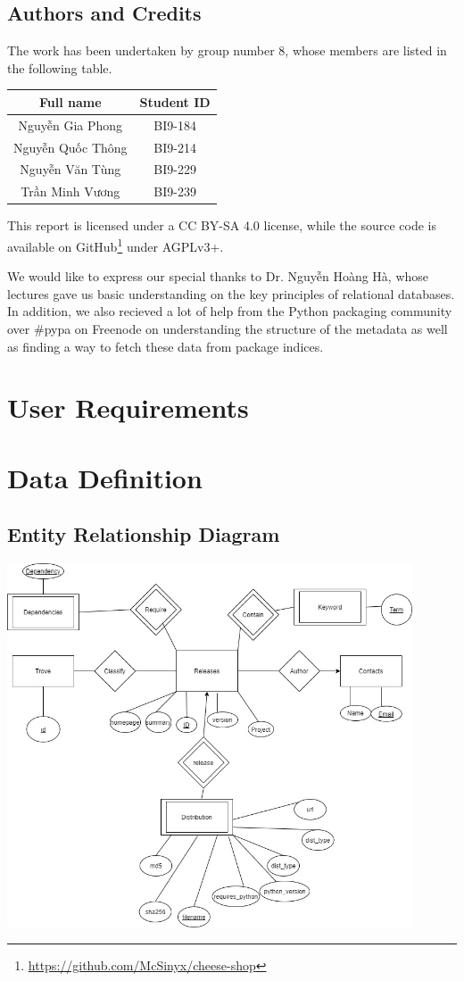 \documentclass[a4paper,12pt]{article}
\begin{document}
\subsection{Authors and Credits}
The work has been undertaken by group number 8, whose members are listed
in the following table.
\begin{center}
  \begin{tabular}{c c}
    \toprule
    Full name & Student ID\\
    \midrule
    Nguyễn Gia Phong & BI9-184\\
    Nguyễn Quốc Thông & BI9-214\\
    Nguyễn Văn Tùng & BI9-229\\
    Trần Minh Vương & BI9-239\\
    \bottomrule
  \end{tabular}
\end{center}

This report is licensed under a CC BY-SA 4.0 license, while the source code is
available on GitHub\footnote{\url{https://github.com/McSinyx/cheese-shop}}
under AGPLv3+.

We would like to express our special thanks to Dr. Nguyễn Hoàng Hà,
whose lectures gave us basic understanding on the key principles of
relational databases.  In addition, we also recieved a lot of help from
the Python packaging community over \#pypa on Freenode on understanding
the structure of the metadata as well as finding a way to fetch these
data from package indices.

\newpage
{}
\section{User Requirements}

\section{Data Definition}
\subsection{Entity Relationship Diagram}
\includegraphics[width=0.9\textwidth]{ER Diagram.jpg}
\end{document}
